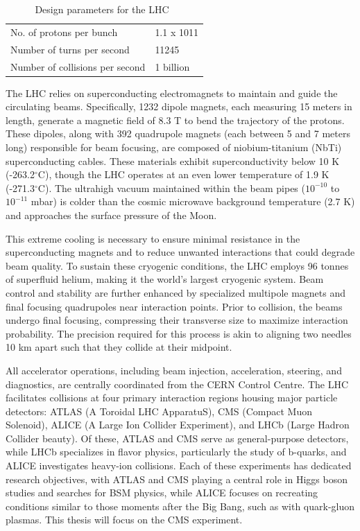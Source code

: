 \begin{table}[]
\begin{tabular}{|l|l|}
    No. of protons per bunch        & 1.1 x 1011                                                                      \\
    Number of turns per second      & 11245                                                                           \\
    Number of collisions per second & 1 billion                                                                       \\ \hline
    \end{tabular}
    \caption{Design parameters for the LHC~\cite{CERNBroc79}}
    \label{tab:LHCparam}
\end{table}

The LHC relies on superconducting electromagnets to maintain and guide the circulating beams. Specifically, 1232 dipole magnets, each measuring 15 meters in length, generate a magnetic field of 8.3 T to bend the trajectory of the protons. These dipoles, along with 392 quadrupole magnets (each between 5 and 7 meters long) responsible for beam focusing, are composed of niobium-titanium (NbTi) superconducting cables. These materials exhibit superconductivity below 10 K (-263.2$^{\circ}$C), though the LHC operates at an even lower temperature of 1.9 K (-271.3$^{\circ}$C). The ultrahigh vacuum maintained within the beam pipes ($10^{-10}$ to $10^{-11}$ mbar) is colder than the cosmic microwave background temperature (2.7 K) and approaches the surface pressure of the Moon. 

This extreme cooling is necessary to ensure minimal resistance in the superconducting magnets and to reduce unwanted interactions that could degrade beam quality. To sustain these cryogenic conditions, the LHC employs 96 tonnes of superfluid helium, making it the world’s largest cryogenic system. Beam control and stability are further enhanced by specialized multipole magnets and final focusing quadrupoles near interaction points. Prior to collision, the beams undergo final focusing, compressing their transverse size to maximize interaction probability. The precision required for this process is akin to aligning two needles 10 km apart such that they collide at their midpoint. 

All accelerator operations, including beam injection, acceleration, steering, and diagnostics, are centrally coordinated from the CERN Control Centre. The LHC facilitates collisions at four primary interaction regions housing major particle detectors: ATLAS (A Toroidal LHC ApparatuS), CMS (Compact Muon Solenoid), ALICE (A Large Ion Collider Experiment), and LHCb (Large Hadron Collider beauty). Of these, ATLAS and CMS serve as general-purpose detectors, while LHCb specializes in flavor physics, particularly the study of b-quarks, and ALICE investigates heavy-ion collisions. Each of these experiments has dedicated research objectives, with ATLAS and CMS playing a central role in Higgs boson studies and searches for BSM physics, while ALICE focuses on recreating conditions similar to those moments after the Big Bang, such as with quark-gluon plasmas. This thesis will focus on the CMS experiment.


